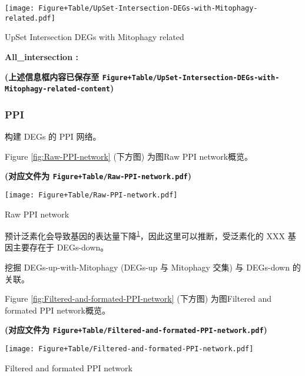 \documentclass[
]{article}
\begin{document}
\def\@captype{figure}
\begin{center}
\texttt{[image: Figure+Table/UpSet-Intersection-DEGs-with-Mitophagy-related.pdf]}
\caption{UpSet Intersection DEGs with Mitophagy related}\label{fig:UpSet-Intersection-DEGs-with-Mitophagy-related}
\end{center}
\begin{center}\begin{tcolorbox}[colback=gray!10, colframe=gray!50, width=0.9\linewidth, arc=1mm, boxrule=0.5pt]
\textbf{
All\_intersection
:}

\vspace{0.5em}



\vspace{2em}
\end{tcolorbox}
\end{center}

\textbf{(上述信息框内容已保存至 \texttt{Figure+Table/UpSet-Intersection-DEGs-with-Mitophagy-related-content})}

\hypertarget{ppi}{%
\subsubsection{PPI}\label{ppi}}

构建 DEGs 的 PPI 网络。

Figure \ref{fig:Raw-PPI-network} (下方图) 为图Raw PPI network概览。

\textbf{(对应文件为 \texttt{Figure+Table/Raw-PPI-network.pdf})}

\def\@captype{figure}
\begin{center}
\texttt{[image: Figure+Table/Raw-PPI-network.pdf]}
\caption{Raw PPI network}\label{fig:Raw-PPI-network}
\end{center}

预计泛素化会导致基因的表达量下降\textsuperscript{\protect\hyperlink{ref-UbiquitinationPopovi2014}{1}}，因此这里可以推断，受泛素化的 XXX 基因主要存在于 DEGs-down。

挖掘 DEGs-up-with-Mitophagy (DEGs-up 与 Mitophagy 交集) 与 DEGs-down 的关联。

Figure \ref{fig:Filtered-and-formated-PPI-network} (下方图) 为图Filtered and formated PPI network概览。

\textbf{(对应文件为 \texttt{Figure+Table/Filtered-and-formated-PPI-network.pdf})}

\def\@captype{figure}
\begin{center}
\texttt{[image: Figure+Table/Filtered-and-formated-PPI-network.pdf]}
\caption{Filtered and formated PPI network}\label{fig:Filtered-and-formated-PPI-network}
\end{center}
\end{document}
